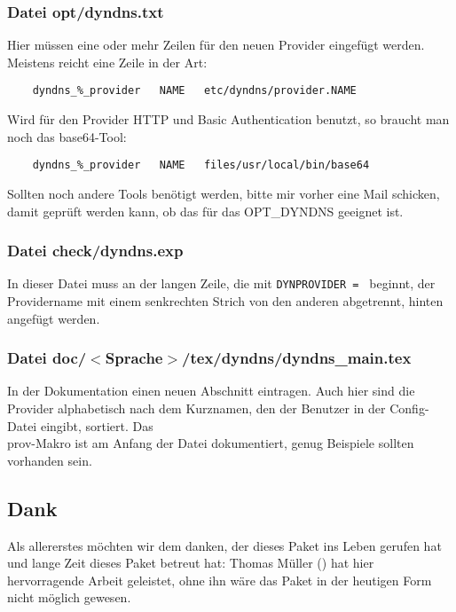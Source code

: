 \subsubsection{Datei opt/dyndns.txt}

Hier müssen eine oder mehr Zeilen für den neuen Provider eingefügt werden.
Meistens reicht eine Zeile in der Art:

\begin{verbatim}
	dyndns_%_provider   NAME   etc/dyndns/provider.NAME
\end{verbatim}

Wird für den Provider HTTP und Basic Authentication benutzt, so braucht man
noch das base64-Tool:

\begin{verbatim}
	dyndns_%_provider   NAME   files/usr/local/bin/base64
\end{verbatim}

Sollten noch andere Tools benötigt werden, bitte mir vorher eine Mail
schicken, damit geprüft werden kann, ob das für das OPT\_DYNDNS geeignet ist.

\subsubsection{Datei check/dyndns.exp}

In dieser Datei muss an der langen Zeile, die mit \texttt{DYNPROVIDER = }
beginnt, der Providername mit einem senkrechten Strich von den anderen
abgetrennt, hinten angefügt werden.

\subsubsection{Datei doc/$<$Sprache$>$/tex/dyndns/dyndns\_main.tex}

In der Dokumentation einen neuen Abschnitt eintragen. Auch hier sind die
Provider alphabetisch nach dem Kurznamen, den der Benutzer in der
Config-Datei eingibt, sortiert. Das \\prov-Makro ist am Anfang der Datei
dokumentiert, genug Beispiele sollten vorhanden sein.

\subsection{Dank}

Als allererstes möchten wir dem danken, der dieses Paket ins Leben gerufen
hat und lange Zeit dieses Paket betreut hat:
Thomas Müller () hat hier hervorragende
Arbeit geleistet, ohne ihn wäre das Paket in der heutigen Form nicht
möglich gewesen.

